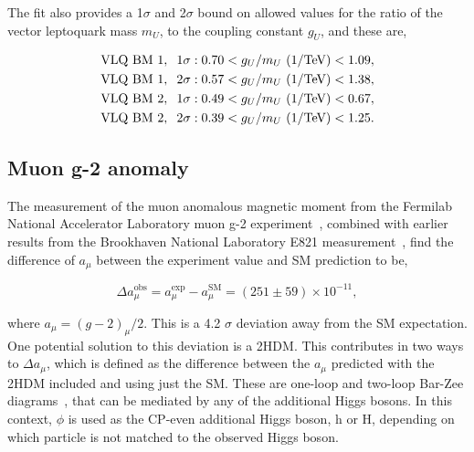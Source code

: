 The fit also provides a 1$\sigma$ and 2$\sigma$ bound on allowed values for the ratio of the vector leptoquark mass $m_{U}$, to the coupling constant $g_{U}$, and these are,

\begin{align}
\begin{split}
\text{VLQ BM 1}, \hspace{0.2cm} 1\sigma&: 0.70 < g_{U}/m_{U} \text{ (1/TeV)} < 1.09, \\
\text{VLQ BM 1}, \hspace{0.2cm} 2\sigma&: 0.57 < g_{U}/m_{U} \text{ (1/TeV)} < 1.38, \\
\text{VLQ BM 2}, \hspace{0.2cm} 1\sigma&: 0.49 < g_{U}/m_{U} \text{ (1/TeV)} < 0.67, \\
\text{VLQ BM 2}, \hspace{0.2cm} 2\sigma&: 0.39 < g_{U}/m_{U} \text{ (1/TeV)} < 1.25.
\end{split}
\end{align}

\subsection{Muon g-2 anomaly}
\label{sec:gm2_anomaly}

The measurement of the muon anomalous magnetic moment from the Fermilab National Accelerator Laboratory muon g-2 experiment~\cite{Muong-2:2021ojo}, combined with earlier results from the Brookhaven National Laboratory E821 measurement~\cite{Muong-2:2006rrc}, find the difference of $a_\mu$ between the experiment value and \ac{SM} prediction to be,

\begin{equation}
\Delta a_{\mu}^{\text{obs}} = a_{\mu}^{\text{exp}} - a_{\mu}^{\text{SM}} = (251 \pm 59) \times 10^{-11},
\end{equation}

where $a_{\mu}=(g-2)_{\mu}/2$. 
This is a 4.2 $\sigma$ deviation away from the \ac{SM} expectation.
One potential solution to this deviation is a \ac{2HDM}.
This contributes in two ways to $\Delta a_{\mu}$, which is defined as the difference between the $a_{\mu}$ predicted with the \ac{2HDM} included and using just the \ac{SM}. 
These are one-loop and two-loop Bar-Zee diagrams~\cite{Ilisie:2015tra,Barr:1990vd}, that can be mediated by any of the additional Higgs bosons.
In this context, $\phi$ is used as the \ac{CP}-even additional Higgs boson, h or H, depending on which particle is not matched to the observed Higgs boson. \\

